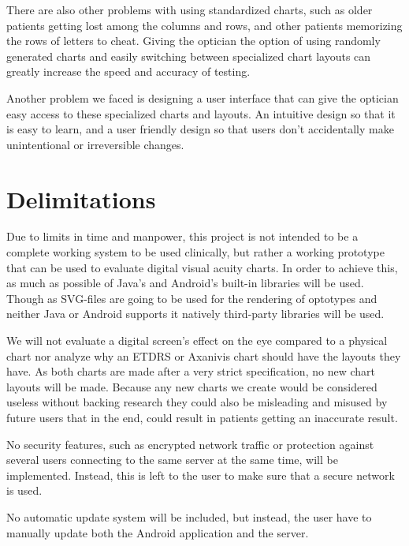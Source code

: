 \documentclass[12pt,a4paper,notitlepage]{report}
\begin{document}
There are also other problems with using standardized charts, such as older patients getting lost among the columns and rows, and other patients memorizing the rows of letters to cheat. Giving the optician the option of using randomly generated charts and easily switching between specialized chart layouts can greatly increase the speed and accuracy of testing.

Another problem we faced is designing a user interface that can give the optician easy access to these specialized charts and layouts. An intuitive design so that it is easy to learn, and a user friendly design so that users don't accidentally make unintentional or irreversible changes.

\section{Delimitations}
Due to limits in time and manpower, this project is not intended to be a complete working system to be used clinically, but rather a working prototype that can be used to evaluate digital visual acuity charts. In order to achieve this, as much as possible of Java's and Android's built-in libraries will be used. Though as SVG-files are going to be used for the rendering of optotypes and neither Java or Android supports it natively third-party libraries will be used.

We will not evaluate a digital screen's effect on the eye compared to a physical chart nor analyze why an ETDRS or Axanivis chart should have the layouts they have. As both charts are made after a very strict specification, no new chart layouts will be made. Because any new charts we create would be considered useless without backing research they could also be misleading and misused by future users that in the end, could result in patients getting an inaccurate result.

No security features, such as encrypted network traffic or protection against several users connecting to the same server at the same time, will be implemented. Instead, this is left to the user to make sure that a secure network is used.

No automatic update system will be included, but instead, the user have to manually update both the Android application and the server.
\end{document}
